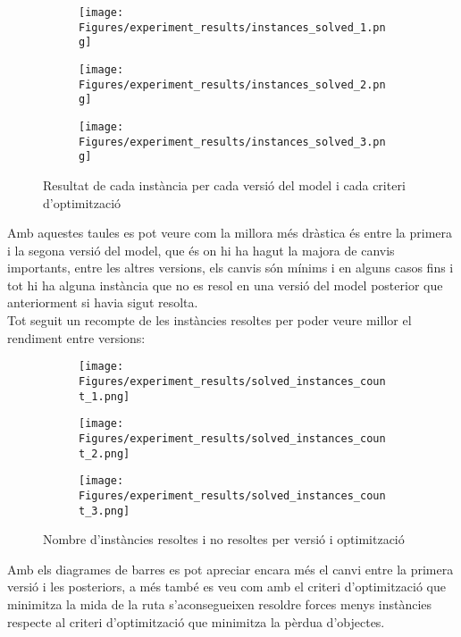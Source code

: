 \begin{figure}[H]
    \centering
    \begin{subfigure}{0.4\textwidth}
        \texttt{[image: Figures/experiment\_results/instances\_solved\_1.png]}
    \end{subfigure}
    \hfill
    \begin{subfigure}{0.4\textwidth}
        \texttt{[image: Figures/experiment\_results/instances\_solved\_2.png]}
    \end{subfigure}
    \hfill
    \begin{subfigure}{0.4\textwidth}
        \texttt{[image: Figures/experiment\_results/instances\_solved\_3.png]}
    \end{subfigure}
    \caption{Resultat de cada instància per cada versió del model i cada criteri d'optimització}
\end{figure}

Amb aquestes taules es pot veure com la millora més dràstica és entre la primera i la segona versió del model, que és on hi ha hagut la majora de canvis importants, entre les altres versions, els canvis són mínims i en alguns casos fins i tot hi ha alguna instància que no es resol en una versió del model posterior que anteriorment si havia sigut resolta.\\
Tot seguit un recompte de les instàncies resoltes per poder veure millor el rendiment entre versions:

\begin{figure}[H]
    \centering
    \begin{subfigure}{0.6\textwidth}
        \texttt{[image: Figures/experiment\_results/solved\_instances\_count\_1.png]}
    \end{subfigure}
    \hfill
    \begin{subfigure}{0.6\textwidth}
        \texttt{[image: Figures/experiment\_results/solved\_instances\_count\_2.png]}
    \end{subfigure}
    \hfill
    \begin{subfigure}{0.6\textwidth}
        \texttt{[image: Figures/experiment\_results/solved\_instances\_count\_3.png]}
    \end{subfigure}
    \caption{Nombre d'instàncies resoltes i no resoltes per versió i optimització}
\end{figure}

Amb els diagrames de barres es pot apreciar encara més el canvi entre la primera versió i les posteriors, a més també es veu com amb el criteri d'optimització que minimitza la mida de la ruta s'aconsegueixen resoldre forces menys instàncies respecte al criteri d'optimització que minimitza la pèrdua d'objectes.\\

